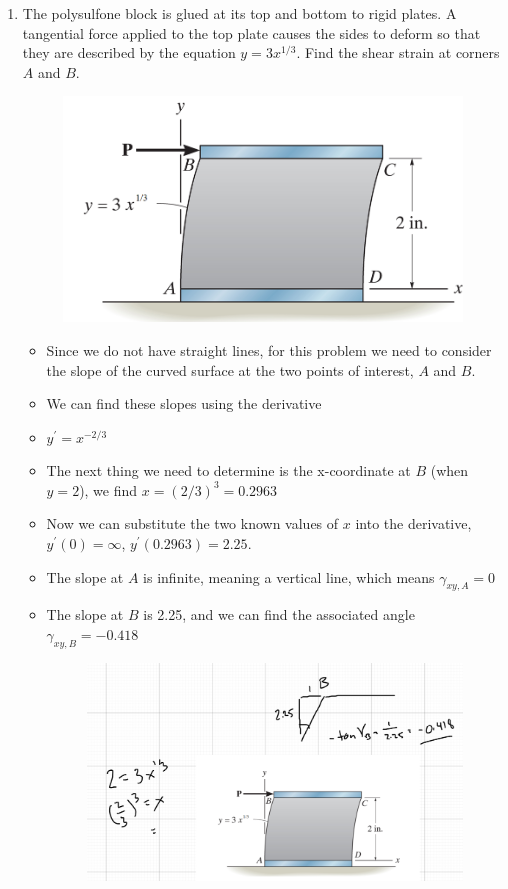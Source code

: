 \documentclass[12pt, oneside]{article}
\begin{document}
\begin{enumerate}
	\item %
		The polysulfone block is glued at its top and bottom to rigid plates.
		A tangential force applied to the top plate causes the sides to deform so that they are described by the equation $y=3x^{1/3}$.
		Find the shear strain at corners $A$ and $B$.
		\begin{figure}[H]
			\centering
			\includegraphics[width=0.5\linewidth]{shear2}
			\label{fig:shear2}
		\end{figure}
		\begin{itemize}
			\item Since we do not have straight lines, for this problem we need to consider the slope of the curved surface at the two points of interest, $A$ and $B$.
			\item We can find these slopes using the derivative
			\item $y^\prime = x^{-2/3}$
			\item The next thing we need to determine is the x-coordinate at $B$ (when $y=2$), we find $x=(2/3)^3 = 0.2963$
			\item Now we can substitute the two known values of $x$ into the derivative, $y^\prime(0) = \infty$, $y^\prime(0.2963) = 2.25$.
			\item The slope at $A$ is infinite, meaning a vertical line, which means $\gamma_{xy,A} = 0$
			\item The slope at $B$ is 2.25, and we can find the associated angle $\gamma_{xy,B} = -0.418$
				\begin{figure}[H]
					\centering
					\includegraphics[width=0.6\linewidth]{hw2-4}
				\end{figure}
		\end{itemize}


\end{enumerate}
\end{document}
